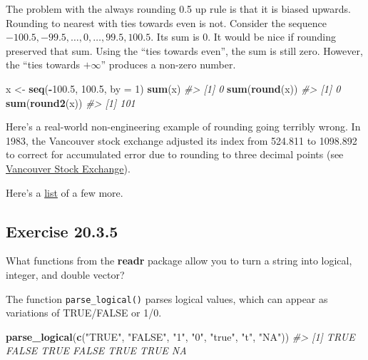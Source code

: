 \documentclass[]{book}
\newenvironment{Shaded}{\begin{snugshade}}{\end{snugshade}}
\newcommand{\CommentTok}[1]{\textcolor[rgb]{0.56,0.35,0.01}{\textit{#1}}}
\newcommand{\DataTypeTok}[1]{\textcolor[rgb]{0.13,0.29,0.53}{#1}}
\newcommand{\DecValTok}[1]{\textcolor[rgb]{0.00,0.00,0.81}{#1}}
\newcommand{\FloatTok}[1]{\textcolor[rgb]{0.00,0.00,0.81}{#1}}
\newcommand{\KeywordTok}[1]{\textcolor[rgb]{0.13,0.29,0.53}{\textbf{#1}}}
\newcommand{\NormalTok}[1]{#1}
\newcommand{\OperatorTok}[1]{\textcolor[rgb]{0.81,0.36,0.00}{\textbf{#1}}}
\newcommand{\StringTok}[1]{\textcolor[rgb]{0.31,0.60,0.02}{#1}}
\theoremstyle{plain}
\theoremstyle{remark}
\theoremstyle{definition}
\theoremstyle{definition}
\theoremstyle{definition}
\theoremstyle{remark}
\begin{document}
The problem with the always rounding 0.5 up rule is that it is biased
upwards. Rounding to nearest with ties towards even is not. Consider the
sequence \(-100.5, -99.5, \dots, 0, \dots, 99.5, 100.5\). Its sum is 0.
It would be nice if rounding preserved that sum. Using the ``ties
towards even'', the sum is still zero. However, the ``ties towards
\(+\infty\)'' produces a non-zero number.

\begin{Shaded}
\begin{Highlighting}[]
\NormalTok{x <-}\StringTok{ }\KeywordTok{seq}\NormalTok{(}\OperatorTok{-}\FloatTok{100.5}\NormalTok{, }\FloatTok{100.5}\NormalTok{, }\DataTypeTok{by =} \DecValTok{1}\NormalTok{)}
\KeywordTok{sum}\NormalTok{(x)}
\CommentTok{#> [1] 0}
\KeywordTok{sum}\NormalTok{(}\KeywordTok{round}\NormalTok{(x))}
\CommentTok{#> [1] 0}
\KeywordTok{sum}\NormalTok{(}\KeywordTok{round2}\NormalTok{(x))}
\CommentTok{#> [1] 101}
\end{Highlighting}
\end{Shaded}

Here's a real-world non-engineering example of rounding going terribly
wrong. In 1983, the Vancouver stock exchange adjusted its index from
524.811 to 1098.892 to correct for accumulated error due to rounding to
three decimal points (see
\href{https://en.wikipedia.org/wiki/Vancouver_Stock_Exchange}{Vancouver
Stock Exchange}).

Here's a
\href{https://www.ma.utexas.edu/users/arbogast/misc/disasters.html}{list}
of a few more.

\hypertarget{exercise-20.3.5}{%
\subsection*{\texorpdfstring{Exercise
{20.3.5}}{Exercise 20.3.5}}\label{exercise-20.3.5}}

What functions from the \textbf{readr} package allow you to turn a
string into logical, integer, and double vector?

The function \texttt{parse\_logical()} parses logical values, which can
appear as variations of TRUE/FALSE or 1/0.

\begin{Shaded}
\begin{Highlighting}[]
\KeywordTok{parse_logical}\NormalTok{(}\KeywordTok{c}\NormalTok{(}\StringTok{"TRUE"}\NormalTok{, }\StringTok{"FALSE"}\NormalTok{, }\StringTok{"1"}\NormalTok{, }\StringTok{"0"}\NormalTok{, }\StringTok{"true"}\NormalTok{, }\StringTok{"t"}\NormalTok{, }\StringTok{"NA"}\NormalTok{))}
\CommentTok{#> [1]  TRUE FALSE  TRUE FALSE  TRUE  TRUE    NA}
\end{Highlighting}
\end{Shaded}
\end{document}
